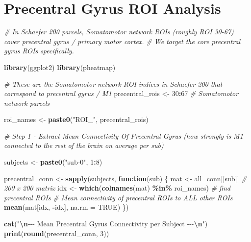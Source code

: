 \documentclass[
]{article}
\newenvironment{Shaded}{\begin{snugshade}}{\end{snugshade}}
\newcommand{\AttributeTok}[1]{\textcolor[rgb]{0.13,0.29,0.53}{#1}}
\newcommand{\CommentTok}[1]{\textcolor[rgb]{0.56,0.35,0.01}{\textit{#1}}}
\newcommand{\ConstantTok}[1]{\textcolor[rgb]{0.56,0.35,0.01}{#1}}
\newcommand{\ControlFlowTok}[1]{\textcolor[rgb]{0.13,0.29,0.53}{\textbf{#1}}}
\newcommand{\DecValTok}[1]{\textcolor[rgb]{0.00,0.00,0.81}{#1}}
\newcommand{\FunctionTok}[1]{\textcolor[rgb]{0.13,0.29,0.53}{\textbf{#1}}}
\newcommand{\NormalTok}[1]{#1}
\newcommand{\OtherTok}[1]{\textcolor[rgb]{0.56,0.35,0.01}{#1}}
\newcommand{\SpecialCharTok}[1]{\textcolor[rgb]{0.81,0.36,0.00}{\textbf{#1}}}
\newcommand{\StringTok}[1]{\textcolor[rgb]{0.31,0.60,0.02}{#1}}
\begin{document}
\section{Precentral Gyrus ROI
Analysis}\label{precentral-gyrus-roi-analysis}

\begin{Shaded}
\begin{Highlighting}[]
\CommentTok{\# In Schaefer 200 parcels, Somatomotor network ROIs (roughly ROI 30{-}67) cover precentral gyrus / primary motor cortex.}
\CommentTok{\# We target the core precentral gyrus ROIs specifically.}

\FunctionTok{library}\NormalTok{(ggplot2)}
\FunctionTok{library}\NormalTok{(pheatmap)}

\CommentTok{\# These are the Somatomotor network ROI indices in Schaefer 200 that correspond to precentral gyrus / M1}
\NormalTok{precentral\_rois }\OtherTok{\textless{}{-}} \DecValTok{30}\SpecialCharTok{:}\DecValTok{67} \CommentTok{\# Somatomotor network parcels}

\NormalTok{roi\_names }\OtherTok{\textless{}{-}} \FunctionTok{paste0}\NormalTok{(}\StringTok{"ROI\_"}\NormalTok{, precentral\_rois)}
\end{Highlighting}
\end{Shaded}

\begin{Shaded}
\begin{Highlighting}[]
\CommentTok{\# Step 1 {-} Extract Mean Connectivity Of Precentral Gyrus (how strongly is M1 connected to the rest of the brain on average per sub)}

\NormalTok{subjects }\OtherTok{\textless{}{-}} \FunctionTok{paste0}\NormalTok{(}\StringTok{"sub{-}0"}\NormalTok{, }\DecValTok{1}\SpecialCharTok{:}\DecValTok{8}\NormalTok{)}

\NormalTok{precentral\_conn }\OtherTok{\textless{}{-}} \FunctionTok{sapply}\NormalTok{(subjects, }\ControlFlowTok{function}\NormalTok{(sub) \{}
\NormalTok{  mat  }\OtherTok{\textless{}{-}}\NormalTok{ all\_conn[[sub]]                         }\CommentTok{\# 200 x 200 matrix}
\NormalTok{  idx  }\OtherTok{\textless{}{-}} \FunctionTok{which}\NormalTok{(}\FunctionTok{colnames}\NormalTok{(mat) }\SpecialCharTok{\%in\%}\NormalTok{ roi\_names)     }\CommentTok{\# find precentral ROIs}
  \CommentTok{\# Mean connectivity of precentral ROIs to ALL other ROIs}
  \FunctionTok{mean}\NormalTok{(mat[idx, }\SpecialCharTok{{-}}\NormalTok{idx], }\AttributeTok{na.rm =} \ConstantTok{TRUE}\NormalTok{)}
\NormalTok{\})}

\FunctionTok{cat}\NormalTok{(}\StringTok{"}\SpecialCharTok{\textbackslash{}n}\StringTok{{-}{-}{-} Mean Precentral Gyrus Connectivity per Subject {-}{-}{-}}\SpecialCharTok{\textbackslash{}n}\StringTok{"}\NormalTok{)}
\FunctionTok{print}\NormalTok{(}\FunctionTok{round}\NormalTok{(precentral\_conn, }\DecValTok{3}\NormalTok{))}
\end{Highlighting}
\end{Shaded}
\end{document}

